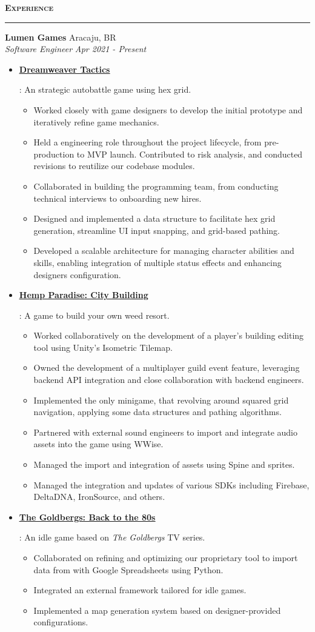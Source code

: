 \documentclass{article}
\newcommand{\resumeItem}[2]{
  \item{
    \textbf{#1}{: #2 \vspace{-5pt}}
  }
}
\newcommand{\simpleItem}[1]{
  \item{
    #1 \vspace{-3pt}
  }
}
\newcommand{\resumeSubheading}[4]{
  \vspace{-5pt}

  \noindent
  \textbf{#1} \dotfill #2 \\
  \resumeSubSubheading{#3}{#4}
}
\newcommand{\resumeSubSubheading}[2]{
    \noindent
    \vspace{5pt}
    \textit{#1} \dotfill \textit{ #2} \\
}
\newcommand{\resumeSubHeadingListStart}{\vspace{-10pt}\begin{itemize}}
\newcommand{\resumeSubHeadingListEnd}{\end{itemize}}
\newcommand{\resumeSubItemListStart}{\vspace{-5pt}\begin{itemize}}
\newcommand{\resumeSubItemListEnd}{\end{itemize}}
\newcommand{\resumeSection}[1]{
  \vspace{5pt}
  {\Large\textbf{\textsc{#1}}} \\
  \par\nobreak\vspace{-6pt}\noindent\textcolor{black}{\rule{\linewidth}{0.4pt}}%
}
\begin{document}
\resumeSection{Experience}
    \resumeSubheading
      {Lumen Games}{Aracaju, BR}
      {Software Engineer}{Apr 2021 - Present}
      \resumeSubHeadingListStart
        \resumeItem
          {\href{https://play.google.com/store/apps/details?id=games.lumen.homatales}{\color{blue}\underline{Dreamweaver Tactics}}}
          {An strategic autobattle game using hex grid.
            \resumeSubItemListStart
              \simpleItem{Worked closely with game designers to develop the initial prototype and iteratively refine game mechanics.}
              \simpleItem{Held a engineering role throughout the project lifecycle, from pre-production to MVP launch. Contributed to risk analysis, and conducted revisions to reutilize our codebase modules.}
              \simpleItem{Collaborated in building the programming team, from conducting technical interviews to onboarding new hires.}
              \simpleItem{Designed and implemented a data structure to facilitate hex grid generation, streamline UI input snapping, and grid-based pathing.}
              \simpleItem{Developed a scalable architecture for managing character abilities and skills, enabling integration of multiple status effects and enhancing designers configuration.}
            \resumeSubItemListEnd
          }
        \resumeItem
          {\href{https://play.google.com/store/apps/details?id=games.redhood.hempparadise}{\color{blue}\underline{Hemp Paradise: City Building}}}
          {A game to build your own weed resort.
            \resumeSubItemListStart
              \simpleItem{Worked collaboratively on the development of a player's building editing tool using Unity's Isometric Tilemap.}
              \simpleItem{Owned the development of a multiplayer guild event feature, leveraging backend API integration and close collaboration with backend engineers.}
              \simpleItem{Implemented the only minigame, that revolving around squared grid navigation, applying some data structures and pathing algorithms.}
              \simpleItem{Partnered with external sound engineers to import and integrate audio assets into the game using WWise.}
              \simpleItem{Managed the import and integration of assets using Spine and sprites.}
              \simpleItem{Managed the integration and updates of various SDKs including Firebase, DeltaDNA, IronSource, and others.}
            \resumeSubItemListEnd
          }
        \resumeItem
          {\href{https://play.google.com/store/apps/details?id=com.eastsidegames.thegoldbergs}{\color{blue}\underline{The Goldbergs: Back to the 80s}}}
          {An idle game based on \textit{The Goldbergs} TV series.
            \resumeSubItemListStart
              \simpleItem{Collaborated on refining and optimizing our proprietary tool to import data from with Google Spreadsheets using Python.}
              \simpleItem{Integrated an external framework tailored for idle games.}
              \simpleItem{Implemented a map generation system based on designer-provided configurations.}
            \resumeSubItemListEnd
          }
      \resumeSubHeadingListEnd
\end{document}
